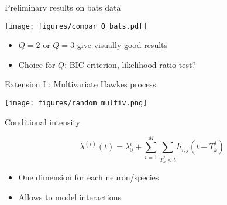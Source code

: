 \documentclass[french,english]{beamer}
\begin{document}
\begin{frame}{Preliminary results on bats data}
\begin{minipage}{6.6cm}
    \texttt{[image: figures/compar\_Q\_bats.pdf]} 
\end{minipage}
   \begin{minipage}{3.8cm}
       \begin{itemize}
       \item $Q=2$ or $Q=3$ give visually good results
        \item Choice for $Q$:  BIC criterion, likelihood ratio test?
       \end{itemize}
   \end{minipage}
\end{frame}


\begin{frame}{Extension I : Multivariate Hawkes process}



\texttt{[image: figures/random\_multiv.png]}

\begin{block}{Conditional intensity}

$$ \lambda^{(i)}(t)=  \lambda_{0}^i + \underset{i=1}{\overset{M}{\sum}} \underset{T_k^j  < t}{\sum} h_{i,j}(t-T_k^j) 
$$    
\end{block}


\begin{itemize}
    \item One dimension for each neuron/species
    \item Allows to model interactions 
\end{itemize}


\end{frame}
\end{document}
